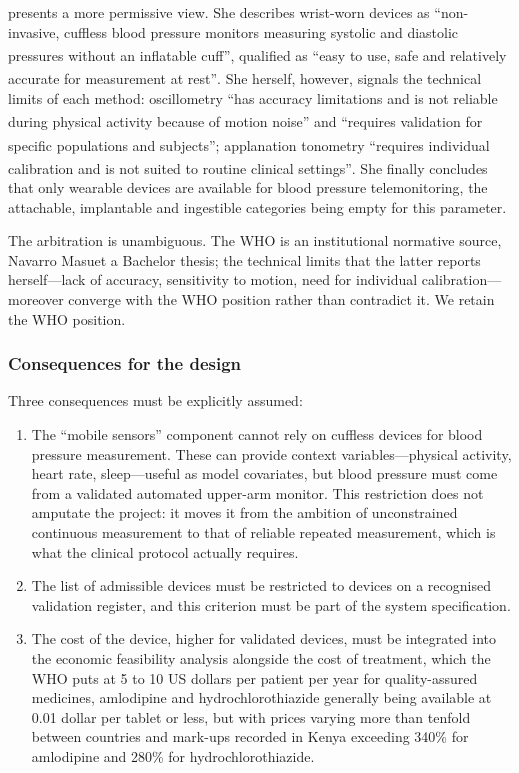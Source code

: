 \documentclass[12pt,a4paper,oneside]{report}
\newcommand{\bq}[1]{``#1''\textsuperscript{\dag}}
\begin{document}
\textcite{navarro2023} presents a more permissive view. She describes wrist-worn devices as \bq{non-invasive, cuffless blood pressure monitors measuring systolic and diastolic pressures without an inflatable cuff}, qualified as \bq{easy to use, safe and relatively accurate for measurement at rest}. She herself, however, signals the technical limits of each method: oscillometry \bq{has accuracy limitations and is not reliable during physical activity because of motion noise} and \bq{requires validation for specific populations and subjects}; applanation tonometry \bq{requires individual calibration and is not suited to routine clinical settings}. She finally concludes that only wearable devices are available for blood pressure telemonitoring, the attachable, implantable and ingestible categories being empty for this parameter.

The arbitration is unambiguous. The WHO is an institutional normative source, Navarro Masuet a Bachelor thesis; the technical limits that the latter reports herself---lack of accuracy, sensitivity to motion, need for individual calibration---moreover converge with the WHO position rather than contradict it. We retain the WHO position.

\subsubsection{Consequences for the design}

Three consequences must be explicitly assumed:
\begin{enumerate}[nosep]
  \item The ``mobile sensors'' component cannot rely on cuffless devices for blood pressure measurement. These can provide context variables---physical activity, heart rate, sleep---useful as model covariates, but blood pressure must come from a validated automated upper-arm monitor. This restriction does not amputate the project: it moves it from the ambition of unconstrained continuous measurement to that of reliable repeated measurement, which is what the clinical protocol actually requires.
  \item The list of admissible devices must be restricted to devices on a recognised validation register, and this criterion must be part of the system specification.
  \item The cost of the device, higher for validated devices, must be integrated into the economic feasibility analysis alongside the cost of treatment, which the WHO puts at 5 to 10 US dollars per patient per year for quality-assured medicines, amlodipine and hydrochlorothiazide generally being available at 0.01 dollar per tablet or less, but with prices varying more than tenfold between countries and mark-ups recorded in Kenya exceeding 340\% for amlodipine and 280\% for hydrochlorothiazide.
\end{enumerate}
\end{document}
